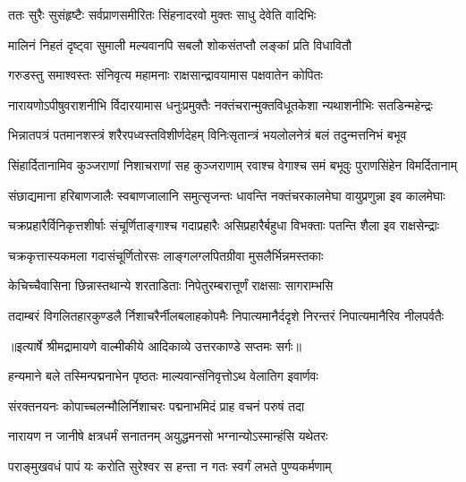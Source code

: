 \twolineshloka
{ततः सुरैः सुसंहृष्टैः सर्वप्राणसमीरितः}
{सिंहनादरवो मुक्तः साधु देवेति वादिभिः} %

\twolineshloka
{मालिनं निहतं दृष्ट्वा सुमाली मल्यवानपि}
{सबलौ शोकसंतप्तौ लङ्कां प्रति विधावितौ} %

\twolineshloka
{गरुडस्तु समाश्वस्तः संनिवृत्य महामनाः}
{राक्षसान्द्रावयामास पक्षवातेन कोपितः} %

\fourlineindentedshloka
{नारायणोऽपीषुवराशनीभि}
{र्विदारयामास धनुःप्रमुक्तैः}
{नक्तंचरान्मुक्तविधूतकेशा}
{न्यथाशनीभिः सतडिन्महेन्द्रः} %

\fourlineindentedshloka
{भिन्नातपत्रं पतमानशस्त्रं}
{ शरैरपध्वस्तविशीर्णदेहम्}
{विनिःसृतान्त्रं भयलोलनेत्रं}
{ बलं तदुन्मत्तनिभं बभूव} %

\fourlineindentedshloka
{सिंहार्दितानामिव कुञ्जराणां}
{ निशाचराणां सह कुञ्जराणाम्}
{रवाश्च वेगाश्च समं बभूवुः}
{ पुराणसिंहेन विमर्दितानाम्} %

\fourlineindentedshloka
{संछाद्यमाना हरिबाणजालैः}
{ स्वबाणजालानि समुत्सृजन्तः}
{धावन्ति नक्तंचरकालमेघा}
{ वायुप्रणुन्ना इव कालमेघाः} %

\fourlineindentedshloka
{चक्रप्रहारैर्विनिकृत्तशीर्षाः}
{ संचूर्णिताङ्गाश्च गदाप्रहारैः}
{असिप्रहारैर्बहुधा विभक्ताः}
{ पतन्ति शैला इव राक्षसेन्द्राः} %

\twolineshloka
{चक्रकृत्तास्यकमला गदासंचूर्णितोरसः}
{लाङ्गलग्लपितग्रीवा मुसलैर्भिन्नमस्तकाः} %

\twolineshloka
{केचिच्चैवासिना छिन्नास्तथान्ये शरताडिताः}
{निपेतुरम्बरात्तूर्णं राक्षसाः सागराम्भसि} %

\fourlineindentedshloka
{तदाम्बरं विगलितहारकुण्डलै}
{र्निशाचरैर्नीलबलाहकोपमैः}
{निपात्यमानैर्ददृशे निरन्तरं}
{ निपात्यमानैरिव नीलपर्वतैः} %


{॥इत्यार्षे श्रीमद्रामायणे वाल्मीकीये आदिकाव्ये उत्तरकाण्डे सप्तमः सर्गः॥}


\twolineshloka
{हन्यमाने बले तस्मिन्पद्मनाभेन पृष्ठतः}
{माल्यवान्संनिवृत्तोऽथ वेलातिग इवार्णवः} %

\twolineshloka
{संरक्तनयनः कोपाच्चलन्मौलिर्निशाचरः}
{पद्मनाभमिदं प्राह वचनं परुषं तदा} %

\twolineshloka
{नारायण न जानीषे क्षत्रधर्मं सनातनम्}
{अयुद्धमनसो भग्नान्योऽस्मान्हंसि यथेतरः} %

\twolineshloka
{पराङ्मुखवधं पापं यः करोति सुरेश्वर}
{स हन्ता न गतः स्वर्गं लभते पुण्यकर्मणाम्} %

